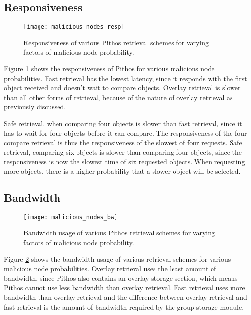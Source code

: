\subsection{Responsiveness}
\begin{figure}[htbp]
 \centering
 \texttt{[image: malicious\_nodes\_resp]}
 \caption{Responsiveness of various Pithos retrieval schemes for varying factors of malicious node probability.}
 \label{fig_malicious_nodes_resp}
\end{figure}
%
Figure \ref{fig_malicious_nodes_resp} shows the responsiveness of Pithos for various malicious node probabilities. Fast retrieval has the lowest latency, since it responds with the first object received and doesn't wait to compare objects. Overlay retrieval is slower than all other forms of retrieval, because of the nature of overlay retrieval as previously discussed.

Safe retrieval, when comparing four objects is slower than fast retrieval, since it has to wait for four objects before it can compare. The responsiveness of the four compare retrieval is thus the responsiveness of the slowest of four requests. Safe retrieval, comparing six objects is slower than comparing four objects, since the responsiveness is now the slowest time of six requested objects. When requesting more objects, there is a higher probability that a slower object will be selected.

\subsection{Bandwidth}
\begin{figure}[htbp]
 \centering
 \texttt{[image: malicious\_nodes\_bw]}
 \caption{Bandwidth usage of various Pithos retrieval schemes for varying factors of malicious node probability.}
 \label{fig_malicious_nodes_bw}
\end{figure}
%
Figure \ref{fig_malicious_nodes_bw} shows the bandwidth usage of various retrieval schemes for various malicious node probabilities. Overlay retrieval uses the least amount of bandwidth, since Pithos also contains an overlay storage section, which means Pithos cannot use less bandwidth than overlay retrieval. Fast retrieval uses more bandwidth than overlay retrieval and the difference between overlay retrieval and fast retrieval is the amount of bandwidth required by the group storage module.

